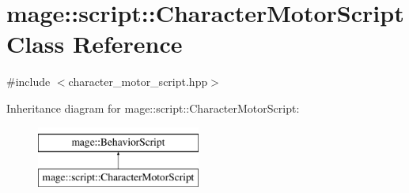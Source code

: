 \hypertarget{classmage_1_1script_1_1_character_motor_script}{}\section{mage\+:\+:script\+:\+:Character\+Motor\+Script Class Reference}
\label{classmage_1_1script_1_1_character_motor_script}


{\ttfamily \#include $<$character\+\_\+motor\+\_\+script.\+hpp$>$}

Inheritance diagram for mage\+:\+:script\+:\+:Character\+Motor\+Script\+:\begin{figure}[H]
\begin{center}
\leavevmode
\includegraphics[height=2.000000cm]{classmage_1_1script_1_1_character_motor_script}
\end{center}
\end{figure}
